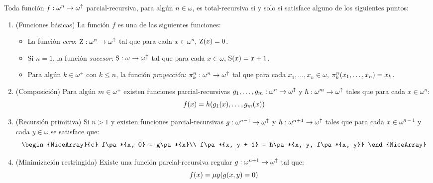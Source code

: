 \begin{theorem}
	Toda función $f:\omega^{n}\to\omega^{\DIVERGE}$ parcial-recursiva, para algún $n\in\omega$, es total-recursiva si y solo si satisface alguno de los siguientes puntos:

	\begin{enumerate}
		\item (Funciones básicas) La función $f$ es una de las siguientes funciones:

		\begin{itemize}
			\item La función \emph{cero}: $\CERO:\omega^{n}\to\omega^{\DIVERGE}$ tal que para cada $x\in\omega^{n}$, $\CERO\pa*{x} = 0$.
			\item Si $n = 1$, la función \emph{sucesor}: $\SUCESOR:\omega\to\omega^{\DIVERGE}$ tal que para cada $x\in\omega$, $\SUCESOR\pa*{x} = x + 1$.
			\item Para algún $k\in\omega^{+}$ con $k\leq n$, la función \emph{proyección}: $\PROYECCION{n}{k}:\omega^{n}\to\omega^{\DIVERGE}$ tal que para cada $x_{1},\dotsc, x_{n}\in\omega$, $\PROYECCION{n}{k}\pa*{x_{1},\dotsc, x_{n}} = x_{k}$.
		\end{itemize}

		\item (Composición) Para algún $m\in\omega^{+}$ existen funciones parcial-recursivas $g_{1},\dotsc, g_{m}:\omega^{n}\to\omega^{\DIVERGE}$ y $h:\omega^{m}\to\omega^{\DIVERGE}$ tales que para cada $x\in\omega^{n}$:
		\[
			f\pa*{x} = h\pa*{g_{1}\pa*{x},\dotsc, g_{m}\pa*{x}}
		\]
		\item (Recursión primitiva) Si $n > 1$ y existen funciones parcial-recursivas $g:\omega^{n - 1}\to\omega^{\DIVERGE}$ y $h:\omega^{n + 1}\to\omega^{\DIVERGE}$ tales que para cada $x\in\omega^{n - 1}$ y cada $y\in\omega$ se satisface que:
		\[
			\begin{NiceArray}{c}
				f\pa*{x, 0} = g\pa*{x}\\
				f\pa*{x, y + 1} = h\pa*{x, y, f\pa*{x, y}}
			\end{NiceArray}
		\]
		\item (Minimización restringida) Existe una función parcial-recursiva regular $g:\omega^{n + 1}\to\omega^{\DIVERGE}$ tal que:
		\[
			f\pa*{x} =\mu y\pa*{g\pa*{x, y} = 0}
		\]
	\end{enumerate}
\end{theorem}


